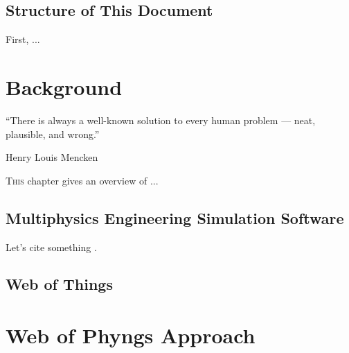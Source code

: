 \documentclass[%
    ]{\PathToTumTemplate/thesis/tum_thesis}
\begin{document}
\section{Structure of This Document}

First, ...






\chapter{Background}\label{chap:bakground}
\epigraph{“There is always a well-known solution to every human problem — neat, plausible, and wrong.”}{Henry Louis Mencken}


\lettrine{T}{his} chapter gives an overview of ... 



\section{Multiphysics Engineering Simulation Software}\label{sec:mess}
Let's cite something \cite{cons_Cor2011}.



\section{Web of Things}\label{sec:wot}






\chapter{Web of Phyngs Approach}\label{chap:approach}
\end{document}
